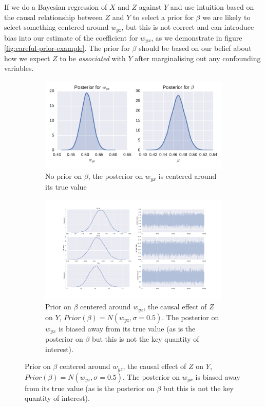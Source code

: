 \documentclass[11pt,a4paper,oneside]{book}
\theoremstyle{plain}
\theoremstyle{definition}
\begin{document}
If we do a Bayesian regression of $X$ and $Z$ against $Y$ and use intuition based on the causal relationship between $Z$ and $Y$ to select a prior for $\beta$ we are likely to select something centered around $w_{yz}$, but this is not correct and can introduce bias into our estimate of the coefficient for $w_{yx}$, as we demonstrate in figure \ref{fig:careful-prior-example}. The prior for $\beta$ should be based on our belief about how we expect $Z$ to be \emph{associated} with $Y$ after marginalising out any confounding variables. 


\begin{figure}[h]
\begin{subfigure}[t]{0.99\textwidth}
     \caption{No prior on $\beta$, the posterior on $w_{yx}$ is centered around its true value}
    \includegraphics[scale=1]{prior_no_prior}
\end{subfigure}
\begin{subfigure}[t]{0.99\textwidth}
     \caption{Prior on $\beta$ centered around $w_{yz}$, the causal effect of $Z$ on $Y$, $Prior(\beta)= N(w_{yz},\sigma = 0.5)$. The posterior on $w_{yx}$ is biased away from its true value (as is the posterior on $\beta$ but this is not the key quantity of interest).}
    \includegraphics[scale=1]{prior_bad_prior.pdf}

\end{subfigure}
\end{figure}
\end{document}
